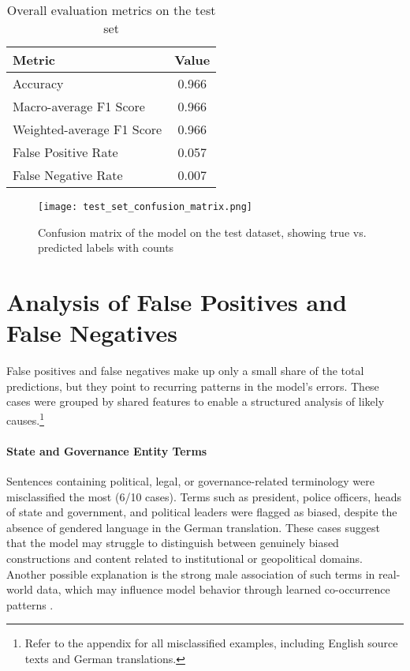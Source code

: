         \vspace{0.8em}
        \begin{table}[H]
            \centering
            \begin{tabular}{lc}
            \toprule
            \textbf{Metric} & \textbf{Value} \\
            \midrule
            Accuracy & 0.966 \\
            Macro-average F1 Score & 0.966 \\
            Weighted-average F1 Score & 0.966 \\
            False Positive Rate & 0.057 \\
            False Negative Rate & 0.007 \\
            \bottomrule
            \end{tabular}
            \caption{Overall evaluation metrics on the test set}
        \end{table}

        \begin{figure}[ht]
            \centering
            \texttt{[image: test\_set\_confusion\_matrix.png]}
            \caption[Confusion matrix on the test dataset]{Confusion matrix of the model on the test dataset, showing true vs. predicted labels with counts}
            \label{fig:test_confusion_matrix}
        \end{figure}


\section{Analysis of False Positives and False Negatives}
    False positives and false negatives make up only a small share of the total predictions, but they point to recurring patterns in the model’s errors. These cases were grouped by shared features to enable a structured analysis of likely causes.\footnote{Refer to the appendix for all misclassified examples, including English source texts and German translations.}

    \paragraph{State and Governance Entity Terms}

    Sentences containing political, legal, or governance-related terminology were misclassified the most (6/10 cases). Terms such as president, police officers, heads of state and government, and political leaders were flagged as biased, despite the absence of gendered language in the German translation. These cases suggest that the model may struggle to distinguish between genuinely biased constructions and content related to institutional or geopolitical domains. Another possible explanation is the strong male association of such terms in real-world data, which may influence model behavior through learned co-occurrence patterns \parencite{kroeberItsLongWay2022}.

